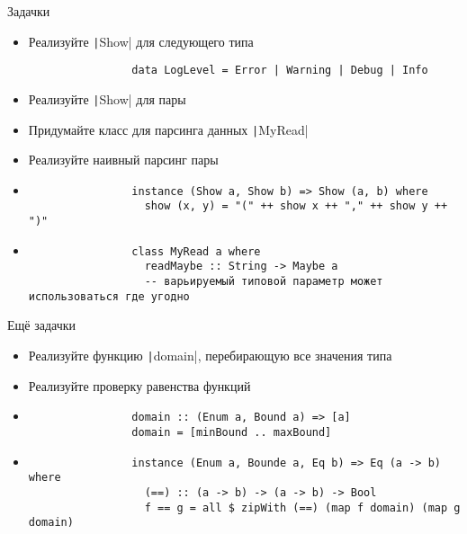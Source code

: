     \begin{frame}[fragile]{Задачки}
        \begin{itemize}
            \item[\todo] Реализуйте \texttt|Show| для следующего типа
            \begin{verbatim}
                data LogLevel = Error | Warning | Debug | Info
            \end{verbatim}
            \item[\todo] Реализуйте \texttt|Show| для пары
            \item[\todo] Придумайте класс для парсинга данных \texttt|MyRead|
            \item[\todo] Реализуйте наивный парсинг пары
            \item[\answer] \pause
            \begin{verbatim}
                instance (Show a, Show b) => Show (a, b) where
                  show (x, y) = "(" ++ show x ++ "," ++ show y ++ ")"
            \end{verbatim}
            \item[\answer] \pause
            \begin{verbatim}
                class MyRead a where
                  readMaybe :: String -> Maybe a
                  -- варьируемый типовой параметр может использоваться где угодно
            \end{verbatim}
        \end{itemize}
    \end{frame}

    \begin{frame}[fragile]{Ещё задачки}
        \begin{itemize}
            \item[\todo] Реализуйте функцию \texttt|domain|, перебирающую все значения типа
            \item[\todo] Реализуйте проверку равенства функций
            \item[\answer] \pause
            \begin{verbatim}
                domain :: (Enum a, Bound a) => [a]
                domain = [minBound .. maxBound]
            \end{verbatim}
            \item[\answer] \pause
            \begin{verbatim}
                instance (Enum a, Bounde a, Eq b) => Eq (a -> b) where
                  (==) :: (a -> b) -> (a -> b) -> Bool
                  f == g = all $ zipWith (==) (map f domain) (map g domain)
            \end{verbatim}
        \end{itemize}
    \end{frame}

